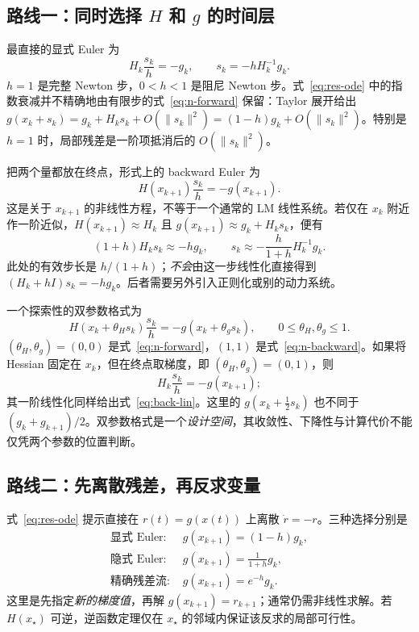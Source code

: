 \documentclass[11pt,a4paper]{ctexart}
\begin{document}
\subsection{路线一：同时选择 $H$ 和 $g$ 的时间层}
最直接的显式 Euler 为
\begin{equation}\label{eq:n-forward}
H_k\frac{s_k}{h}=-g_k,
\qquad s_k=-hH_k^{-1}g_k.
\end{equation}
$h=1$ 是完整 Newton 步，$0<h<1$ 是阻尼 Newton 步。式~\eqref{eq:res-ode} 中的指数衰减并不精确地由有限步的式~\eqref{eq:n-forward} 保留：Taylor 展开给出 $g(x_k+s_k)=g_k+H_ks_k+O(\|s_k\|^2)=(1-h)g_k+O(\|s_k\|^2)$。特别是 $h=1$ 时，局部残差是一阶项抵消后的 $O(\|s_k\|^2)$。

把两个量都放在终点，形式上的 backward Euler 为
\begin{equation}\label{eq:n-backward}
H(x_{k+1})\frac{s_k}{h}=-g(x_{k+1}).
\end{equation}
这是关于 $x_{k+1}$ 的非线性方程，不等于一个通常的 LM 线性系统。若仅在 $x_k$ 附近作一阶近似，$H(x_{k+1})\approx H_k$ 且 $g(x_{k+1})\approx g_k+H_ks_k$，便有
\begin{equation}\label{eq:back-lin}
(1+h)H_ks_k\approx-hg_k,
\qquad s_k\approx-\frac{h}{1+h}H_k^{-1}g_k.
\end{equation}
此处的有效步长是 $h/(1+h)$；\emph{不会}由这一步线性化直接得到 $(H_k+hI)s_k=-hg_k$。后者需要另外引入正则化或别的动力系统。

一个探索性的双参数格式为
\begin{equation}\label{eq:double-theta}
H(x_k+\theta_Hs_k)\frac{s_k}{h}
=-g(x_k+\theta_gs_k),\qquad 0\leq\theta_H,\theta_g\leq1.
\end{equation}
$(\theta_H,\theta_g)=(0,0)$ 是式~\eqref{eq:n-forward}，$(1,1)$ 是式~\eqref{eq:n-backward}。如果将 Hessian 固定在 $x_k$，但在终点取梯度，即 $(\theta_H,\theta_g)=(0,1)$，则
\[
H_k\frac{s_k}{h}=-g(x_{k+1});
\]
其一阶线性化同样给出式~\eqref{eq:back-lin}。这里的 $g(x_k+\tfrac12s_k)$ 也不同于 $(g_k+g_{k+1})/2$。双参数格式是一个\emph{设计空间}，其收敛性、下降性与计算代价不能仅凭两个参数的位置判断。

\subsection{路线二：先离散残差，再反求变量}
式~\eqref{eq:res-ode} 提示直接在 $r(t)=g(x(t))$ 上离散 $\dot r=-r$。三种选择分别是
\begin{align}
\text{显式 Euler: }&g(x_{k+1})=(1-h)g_k,\label{eq:res-exp}\\
\text{隐式 Euler: }&g(x_{k+1})=\frac{1}{1+h}g_k,\label{eq:res-imp}\\
\text{精确残差流: }&g(x_{k+1})=e^{-h}g_k.\label{eq:res-exact}
\end{align}
这里是先指定\emph{新的梯度值}，再解 $g(x_{k+1})=r_{k+1}$；通常仍需非线性求解。若 $H(x_\star)$ 可逆，逆函数定理仅在 $x_\star$ 的邻域内保证该反求的局部可行性。
\end{document}

